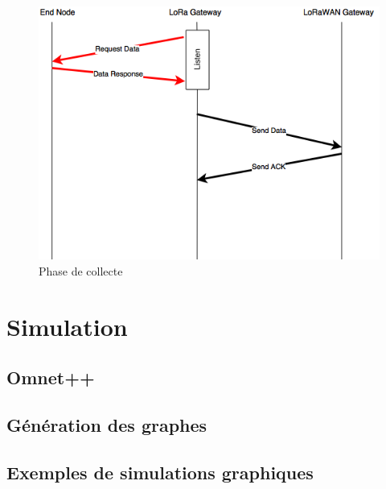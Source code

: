 \documentclass[11pt]{article}
\begin{document}
\begin{figure}[h!]
\centering
\includegraphics[scale=0.6]{Collect.png} 
\caption{Phase de collecte}
\end{figure}

\newpage
\section{Simulation}

\subsection{Omnet++}

\subsection{Génération des graphes}
\newpage
\subsection{Exemples de simulations graphiques}
\end{document}
